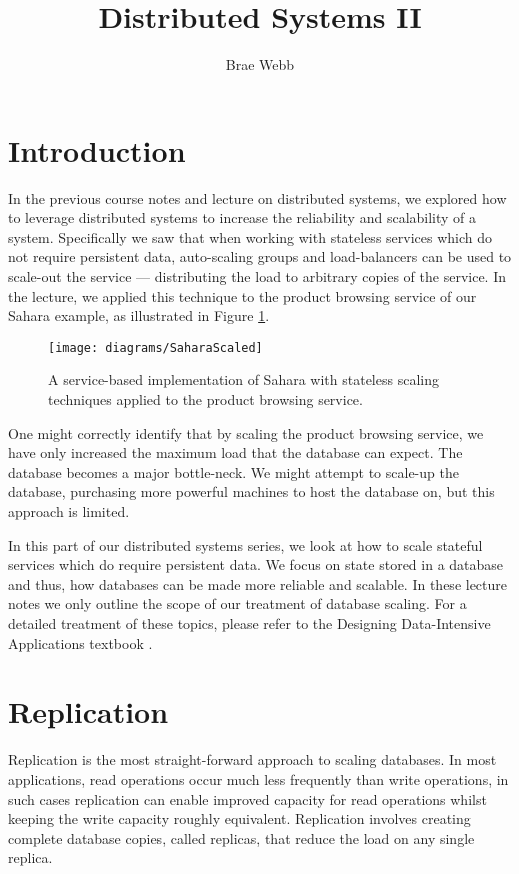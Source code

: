 \title{Distributed Systems II}
\author{Brae Webb}
\date{}

\maketitle

\section{Introduction}
In the previous course notes \cite{distributed1-notes} and lecture \cite{distributed1-slides} on distributed systems,
we explored how to leverage distributed systems to increase the reliability and scalability of a system.
Specifically we saw that when working with stateless services which do not require persistent data,
auto-scaling groups and load-balancers can be used to scale-out the service --- distributing the load to arbitrary copies of the service.
In the lecture, we applied this technique to the product browsing service of our Sahara example,
as illustrated in Figure \ref{fig:scaled-sahara}.

\begin{figure}[H]
\begin{center}
\texttt{[image: diagrams/SaharaScaled]}
\end{center}
\caption{A service-based implementation of Sahara with stateless scaling techniques applied to the product browsing service.}
\label{fig:scaled-sahara}
\end{figure}

One might correctly identify that by scaling the product browsing service,
we have only increased the maximum load that the database can expect.
The database becomes a major bottle-neck.
We might attempt to scale-up the database,
purchasing more powerful machines to host the database on,
but this approach is limited.

In this part of our distributed systems series,
we look at how to scale stateful services which do require persistent data.
We focus on state stored in a database and thus,
how databases can be made more reliable and scalable.
In these lecture notes we only outline the scope of our treatment of database scaling.
For a detailed treatment of these topics,
please refer to the Designing Data-Intensive Applications textbook \cite{data-intensive}.

\section{Replication}
Replication is the most straight-forward approach to scaling databases.
In most applications,
read operations occur much less frequently than write operations,
in such cases replication can enable improved capacity for read operations whilst keeping the write capacity roughly equivalent.
Replication involves creating complete database copies,
called replicas,
that reduce the load on any single replica.

